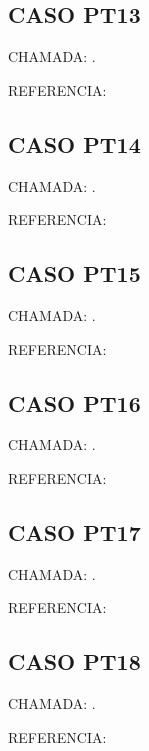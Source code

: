 \documentclass{undftex}
\begin{document}
\begin{refsection}\section*{CASO PT13} CHAMADA: . \textcite{pt13}\par REFERENCIA:\par\printbibliography[heading=none,check=undfconsultadas]\end{refsection}\clearpage
\begin{refsection}\section*{CASO PT14} CHAMADA: . \textcite{pt14}\par REFERENCIA:\par\printbibliography[heading=none,check=undfconsultadas]\end{refsection}\clearpage
\begin{refsection}\section*{CASO PT15} CHAMADA: . \textcite{pt15}\par REFERENCIA:\par\printbibliography[heading=none,check=undfconsultadas]\end{refsection}\clearpage
\begin{refsection}\section*{CASO PT16} CHAMADA: . \textcite{pt16}\par REFERENCIA:\par\printbibliography[heading=none,check=undfconsultadas]\end{refsection}\clearpage
\begin{refsection}\section*{CASO PT17} CHAMADA: . \textcite{pt17}\par REFERENCIA:\par\printbibliography[heading=none,check=undfconsultadas]\end{refsection}\clearpage
\begin{refsection}\section*{CASO PT18} CHAMADA: . \textcite{pt18}\par REFERENCIA:\par\printbibliography[heading=none,check=undfconsultadas]\end{refsection}\clearpage
\end{document}
